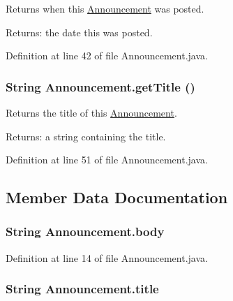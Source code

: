 Returns when this \hyperlink{classAnnouncement}{Announcement} was posted. 

\begin{Desc}
\item[Returns:]the date this was posted. \end{Desc}


Definition at line 42 of file Announcement.java.\hypertarget{classAnnouncement_2432e5072742ed1bcd266954088a40b8}{
\subsubsection{\setlength{\rightskip}{0pt plus 5cm}String Announcement.getTitle ()}}
\label{classAnnouncement_2432e5072742ed1bcd266954088a40b8}


Returns the title of this \hyperlink{classAnnouncement}{Announcement}. 

\begin{Desc}
\item[Returns:]a string containing the title. \end{Desc}


Definition at line 51 of file Announcement.java.

\subsection{Member Data Documentation}
\hypertarget{classAnnouncement_7404bc5a9f7dd0652691fba2bcd5f0b0}{
\subsubsection{\setlength{\rightskip}{0pt plus 5cm}String {\bf Announcement.body}}}
\label{classAnnouncement_7404bc5a9f7dd0652691fba2bcd5f0b0}




Definition at line 14 of file Announcement.java.\hypertarget{classAnnouncement_8abcfd285ced4127d22bb1609478adb2}{
\subsubsection{\setlength{\rightskip}{0pt plus 5cm}String {\bf Announcement.title}}}
\label{classAnnouncement_8abcfd285ced4127d22bb1609478adb2}




